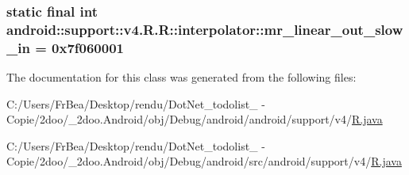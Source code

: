 \hypertarget{classandroid_1_1support_1_1v4_1_1_r_1_1interpolator_fd2cd1174e3b364e3d829766ca3884b6}{
\subsubsection[{mr\_\-linear\_\-out\_\-slow\_\-in}]{\setlength{\rightskip}{0pt plus 5cm}static final int android::support::v4.R.R::interpolator::mr\_\-linear\_\-out\_\-slow\_\-in = 0x7f060001}}
\label{classandroid_1_1support_1_1v4_1_1_r_1_1interpolator_fd2cd1174e3b364e3d829766ca3884b6}




The documentation for this class was generated from the following files:\begin{CompactItemize}
\item 
C:/Users/FrBea/Desktop/rendu/DotNet\_\-todolist\_ - Copie/2doo/\_\-2doo.Android/obj/Debug/android/android/support/v4/\hyperlink{android_2support_2v4_2_r_8java}{R.java}\item 
C:/Users/FrBea/Desktop/rendu/DotNet\_\-todolist\_ - Copie/2doo/\_\-2doo.Android/obj/Debug/android/src/android/support/v4/\hyperlink{src_2android_2support_2v4_2_r_8java}{R.java}\end{CompactItemize}
